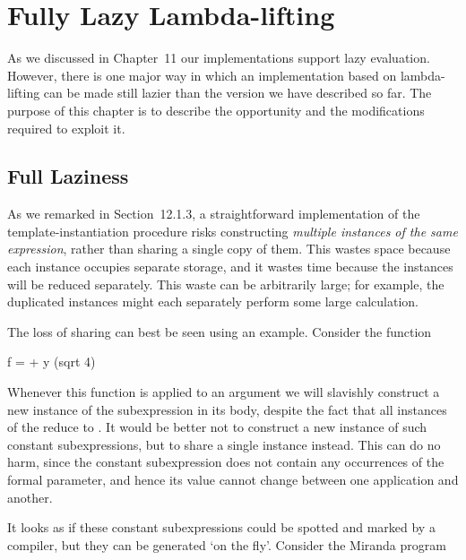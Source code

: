 \chapter{Fully Lazy Lambda-lifting}
\vspace{1cm}

As we discussed in Chapter~11 our implementations support lazy evaluation.
However, there is one major way in which an implementation based on
lambda-lifting can be made still lazier than the version we have described so
far. The purpose of this chapter is to describe the opportunity and the
modifications required to exploit it.

\section{Full Laziness}

As we remarked in Section~12.1.3, a straightforward implementation of the
template-instantiation procedure risks constructing \textit{multiple instances of the
    same expression}, rather than sharing a single copy of them. This wastes space
because each instance occupies separate storage, and it wastes time because
the instances will be reduced separately. This waste can be arbitrarily large;
for example, the duplicated instances might each separately perform some
large calculation.

The loss of sharing can best be seen using an example. Consider the
function
\begin{mlcoded}
    f = + y (sqrt 4)
\end{mlcoded}
Whenever this function is applied to an argument we will slavishly construct a
new instance of the subexpression  in its body, despite the fact that all
instances of the  reduce to . It would be better not to construct a new
instance of such constant subexpressions, but to share a single instance
instead. This can do no harm, since the constant subexpression does not
contain any occurrences of the formal parameter, and hence its value cannot
change between one application and another.

It looks as if these constant subexpressions could be spotted and marked by
a compiler, but they can be generated `on the fly'. Consider the Miranda
program


